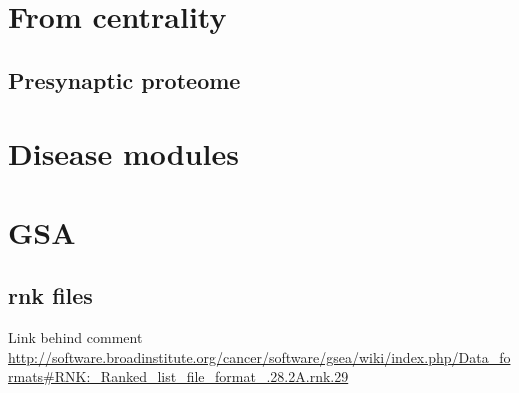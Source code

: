   


\section{From centrality}
\subsection{Presynaptic proteome}



\section{Disease modules}
\section{GSA}
\subsection{rnk files}
Link behind comment \url{http://software.broadinstitute.org/cancer/software/gsea/wiki/index.php/Data_formats#RNK:_Ranked_list_file_format_.28.2A.rnk.29}
\clearpage{}
